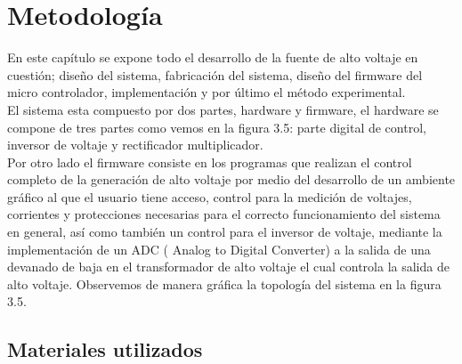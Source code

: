 



\chapter{Metodología}
En este capítulo se expone todo el desarrollo de la fuente de alto voltaje en cuestión; diseño del sistema, fabricación del sistema, diseño del firmware del micro controlador, implementación y por último el método experimental.\\

El sistema esta compuesto por dos partes, hardware y firmware, el hardware se compone de tres partes como vemos en la figura 3.5: parte digital de control, inversor de voltaje y rectificador multiplicador. \\

Por otro lado el firmware consiste en los programas que realizan el control completo de la generación de alto voltaje por medio del desarrollo de un ambiente gráfico al que el usuario tiene acceso,  control para la medición de voltajes, corrientes y protecciones necesarias para el correcto funcionamiento del sistema en general, así como también un control para el inversor de voltaje, mediante la implementación de un ADC ( Analog to Digital Converter) a la salida de una devanado de baja en el transformador de alto voltaje el cual controla la salida de alto voltaje. Observemos de manera gráfica la topología del sistema en la figura 3.5. 
\newpage





\section{Materiales utilizados}

